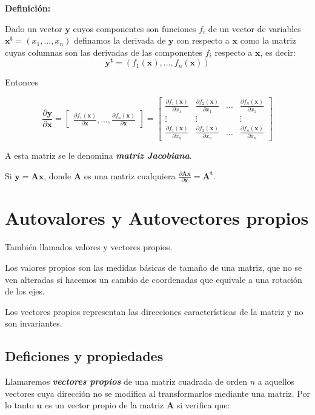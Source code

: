 \documentclass[12pt,letterpaper]{report} %
\begin{document}
\textbf{Definición:}

Dado un vector $\mathbf{y}$ cuyos componentes son funciones $f_i$ de un vector de variables $\mathbf{x^t}=(x_1,...,x_n)$ definamos la derivada de $\mathbf{y}$ con respecto a $\mathbf{x}$ como la matriz cuyas columnas son las derivadas de las componentes $f_i$ respecto a $\mathbf{x}$, es decir:
$$\mathbf{y^t}=(f_1(\mathbf{x}),...,f_n(\mathbf{x}))$$

Entonces

$$\frac{\partial \mathbf{y}}{\partial \mathbf{x}}=\begin{bmatrix} \frac{\partial f_1(\mathbf{x})}{\partial \mathbf{x}},...,\frac{\partial f_n(\mathbf{x})}{\partial \mathbf{x}}\end{bmatrix}= 
\begin{bmatrix}
\frac{\partial f_1(\mathbf{x})}{\partial x_1} & \frac{\partial f_2(\mathbf{x})}{\partial x_1} & ... & \frac{\partial f_n(\mathbf{x})}{\partial x_1} \\
\vdots   & \vdots &   & \vdots \\
\frac{\partial f_1(\mathbf{x})}{\partial x_n} & \frac{\partial f_2(\mathbf{x})}{\partial x_n} & ... & \frac{\partial f_n(\mathbf{x})}{\partial x_n} 
\end{bmatrix} $$

A esta matriz se le denomina \textit{\textbf{matriz Jacobiana}}.

Si $\mathbf{y}=\mathbf{Ax}$, donde $\mathbf{A}$ es una matriz cualquiera $\frac{\partial \mathbf{Ax}}{\partial \mathbf{x}}=\mathbf{A^t}$.

\section{Autovalores y Autovectores propios}

También llamados valores y vectores propios. 

Los valores propios son las medidas básicas de tamaño de una matriz, que no se ven alteradas si hacemos un cambio de coordenadas que equivale a una rotación de los ejes.

Los vectores propios representan las direcciones características de la matriz y no son invariantes. 

\subsection{Deficiones y propiedades}

Llamaremos \textit{\textbf{vectores propios}} de una matriz cuadrada de orden $n$ a aquellos vectores cuya dirección no se modifica al transformarlos mediante una matriz. Por lo tanto $\mathbf{u}$ es un vector propio de la matriz $\mathbf{A}$ si verifica que:
\end{document}
